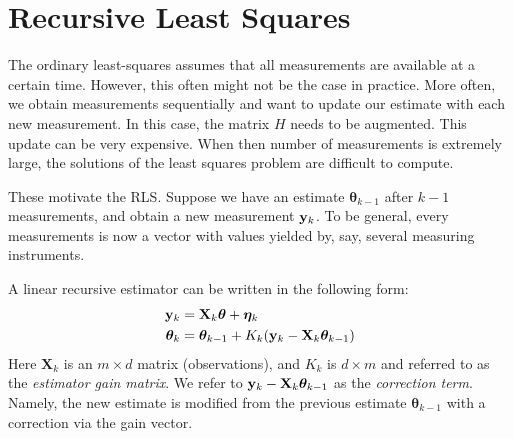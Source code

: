 \section{Recursive Least Squares}
\label{sec:recursive_least_square}

The ordinary least-squares assumes that all measurements are available at a certain time. However, this often might not be the case in practice. More often, we obtain measurements sequentially and want to update our estimate with each new measurement. In this case, the matrix $H$ needs to be augmented. This update can be very expensive. When then number of measurements is extremely large, the solutions of the least squares problem are difficult to compute. 

These motivate the RLS. Suppose we have an estimate $\boldsymbol{\theta}_{k-1}$ after $k-1$ measurements, and obtain a new measurement ${\mathbf{y}}_k$. To be general, every measurements is now a vector with values yielded by, say, several measuring instruments. 

A linear recursive estimator can be written in the following form:
\begin{align*}
	{\mathbf{y}}_k &= \mathbf{X}_k\boldsymbol{\theta}+\boldsymbol{\eta}_k\\
	\boldsymbol{\theta}_k &= \boldsymbol{\theta}_{k-1}+K_k ({\mathbf{y}}_k-\mathbf{X}_k\boldsymbol{\theta}_{k-1})
\end{align*}
Here $\mathbf{X}_k$ is an $m\times d$ matrix (observations), and $K_k$ is $d\times m$ and referred to as the \textit{estimator gain matrix}. We refer to ${\mathbf{y}}_k-\mathbf{X}_k\boldsymbol{\theta}_{k-1}$ as the \textit{correction term}. Namely, the new estimate is modified from the previous estimate $\boldsymbol{\theta}_{k-1}$ with a correction via the gain vector. 

